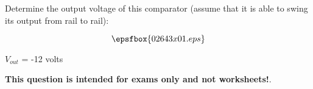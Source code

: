 

Determine the output voltage of this comparator (assume that it is able to swing its output from rail to rail):

$$\epsfbox{02643x01.eps}$$







$V_{out}$ = -12 volts







{\bf This question is intended for exams only and not worksheets!}.




